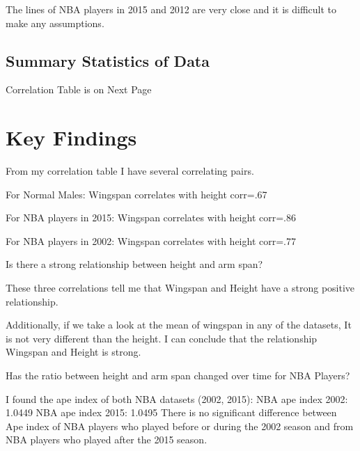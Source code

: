 \documentclass[]{article}
\begin{document}
\noindent The lines of NBA players in 2015 and 2012 are very close and
it is difficult to make any assumptions.

\newpage

\subsection{Summary Statistics of Data}

\noindent Correlation Table is on Next Page \newpage


\label{sec:data-summary}

\newpage

\section{Key Findings}
\label{sec:findings}

From my correlation table I have several correlating pairs.

\noindent For Normal Males: \noindent Wingspan correlates with height
corr=.67

\noindent For NBA players in 2015: Wingspan correlates with height
corr=.86

\noindent For NBA players in 2002: Wingspan correlates with height
corr=.77

\vspace{5mm}

\noindent Is there a strong relationship between height and arm span?
\newline

\noindent These three correlations tell me that Wingspan and Height have
a strong positive relationship.

\noindent Additionally, if we take a look at the mean of wingspan in any
of the datasets, It is not very different than the height. \newline
\noindent I can conclude that the relationship Wingspan and Height is
strong.

\vspace{5mm}

\noindent Has the ratio between height and arm span changed over time
for NBA Players? \newline

\noindent I found the ape index of both NBA datasets (2002, 2015):
\newline \noindent NBA ape index 2002: 1.0449 \newline \noindent NBA ape
index 2015: 1.0495 \newline \noindent There is no significant difference
between Ape index of NBA players who played before or during the 2002
season and from NBA players who played after the 2015 season.
\end{document}
